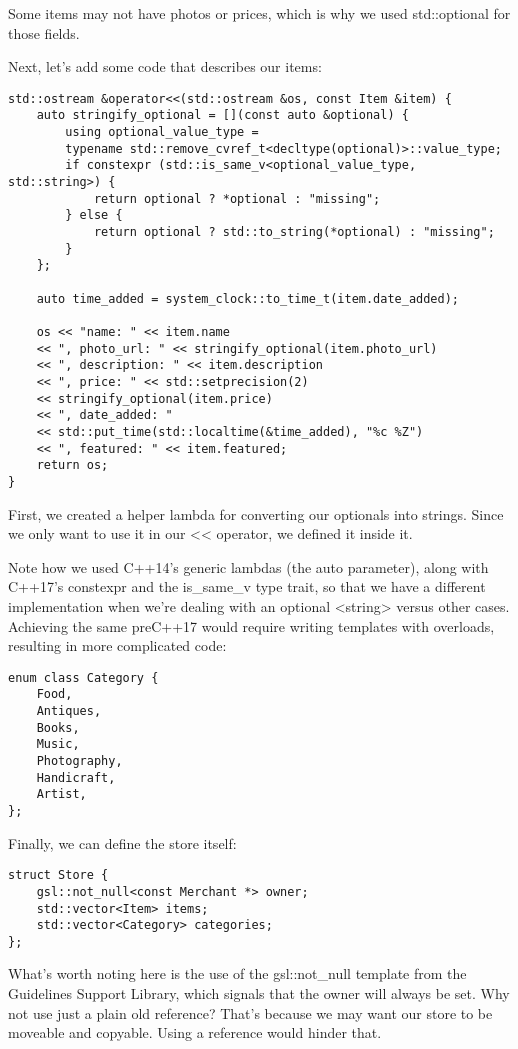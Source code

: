 Some items may not have photos or prices, which is why we used std::optional for those fields.

Next, let's add some code that describes our items:

\begin{lstlisting}[style=styleCXX]
std::ostream &operator<<(std::ostream &os, const Item &item) {
	auto stringify_optional = [](const auto &optional) {
		using optional_value_type =
		typename std::remove_cvref_t<decltype(optional)>::value_type;
		if constexpr (std::is_same_v<optional_value_type, std::string>) {
			return optional ? *optional : "missing";
		} else {
			return optional ? std::to_string(*optional) : "missing";
		}
	};

	auto time_added = system_clock::to_time_t(item.date_added);
	
	os << "name: " << item.name
	<< ", photo_url: " << stringify_optional(item.photo_url)
	<< ", description: " << item.description
	<< ", price: " << std::setprecision(2)
	<< stringify_optional(item.price)
	<< ", date_added: "
	<< std::put_time(std::localtime(&time_added), "%c %Z")
	<< ", featured: " << item.featured;
	return os;
}
\end{lstlisting}

First, we created a helper lambda for converting our optionals into strings. Since we only want to use it in our << operator, we defined it inside it.

Note how we used C++14's generic lambdas (the auto parameter), along with C++17's constexpr and the is\_same\_v type trait, so that we have a different implementation when we're dealing with an optional <string> versus other cases. Achieving the same preC++17 would require writing templates with overloads, resulting in more complicated code:

\begin{lstlisting}[style=styleCXX]
enum class Category {
	Food,
	Antiques,
	Books,
	Music,
	Photography,
	Handicraft,
	Artist,
};
\end{lstlisting}

Finally, we can define the store itself:

\begin{lstlisting}[style=styleCXX]
struct Store {
	gsl::not_null<const Merchant *> owner;
	std::vector<Item> items;
	std::vector<Category> categories;
};
\end{lstlisting}

What's worth noting here is the use of the gsl::not\_null template from the Guidelines Support Library, which signals that the owner will always be set. Why not use just a plain old reference? That's because we may want our store to be moveable and copyable. Using a reference would hinder that.

